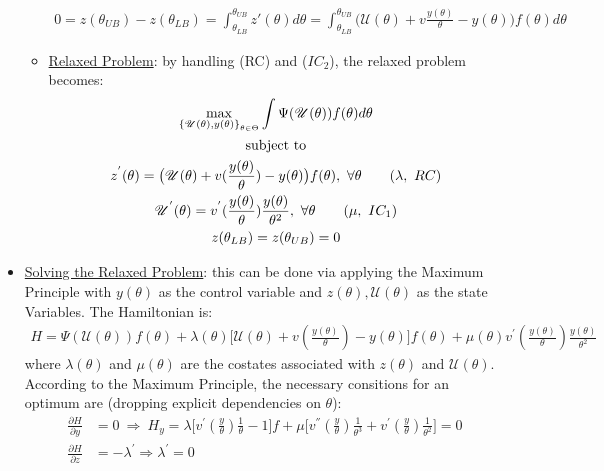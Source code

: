 \documentclass{article}
\begin{document}
\begin{itemize}
\begin{itemize}
        \begin{gather*}
            0 = z(\theta_{UB}) - z(\theta_{LB}) = \int_{\theta_{LB}}^{\theta_{UB}} z'(\theta) d \theta = \int_{\theta_{LB}}^{\theta_{UB}} \big( \mathcal{U}(\theta) + v \frac{y(\theta)}{\theta} - y(\theta) \big) f(\theta) d \theta
        \end{gather*}
        \item  \underline{Relaxed Problem}: by handling (RC) and ($IC_{2}$), the relaxed problem becomes:
        \begin{gather*}
            \max_{\left\{ \mathcal{U}(\theta), y(\theta)\right\}_{\theta \in \Theta}} \int \Psi (\mathcal{U}(\theta))f(\theta) d \theta \\
            \text{subject to} \\
            z^{'}(\theta) = \big(\mathcal{U}(\theta) + v(\frac{y(\theta)}{\theta}) - y(\theta) \big) f(\theta), \ \forall \theta \tag{$\lambda, \ RC$} \\
            \mathcal{U}^{'}(\theta) = v^{'}(\frac{y(\theta)}{\theta}) \frac{y(\theta)}{\theta^{2}}, \ \forall \theta \tag{$\mu, \ IC_{1}$} \\
            z(\theta_{LB}) = z(\theta_{UB}) = 0
        \end{gather*}
    \end{itemize}
    \item  \underline{Solving the Relaxed Problem}: this can be done via applying the Maximum Principle with $y(\theta)$ as the control variable and $z(\theta), \mathcal{U}(\theta)$ as the state Variables. The Hamiltonian is:
    \begin{gather*}
        H = \Psi (\mathcal{U}(\theta)) f(\theta) + \lambda (\theta) \big[\mathcal{U}(\theta) + v(\frac{y(\theta)}{\theta}) - y(\theta) \big] f(\theta) + \mu (\theta) v^{'} (\frac{y(\theta)}{\theta}) \frac{y(\theta)}{\theta^{2}}
    \end{gather*}
    where $\lambda (\theta)$ and $\mu (\theta)$ are the costates associated with $z(\theta)$ and $\mathcal{U}(\theta)$. According to the Maximum Principle, the necessary consitions for an optimum are (dropping explicit dependencies on $\theta$):
    \begin{align*}
        \frac{\partial H}{\partial y} &= 0 \ \Rightarrow \ H_{y} = \lambda \big[v^{'}(\frac{y}{\theta}) \frac{1}{\theta} - 1 \big]f + \mu \big[v^{''}(\frac{y}{\theta})\frac{1}{\theta^{3}} + v^{'}(\frac{y}{\theta}) \frac{1}{\theta^{2}} \big] = 0\\
        \frac{\partial H}{\partial z} &= -\lambda^{'} \Rightarrow \lambda^{'} = 0 \\

\end{align*}
\end{itemize}
\end{document}
